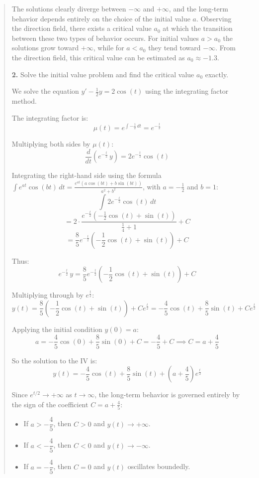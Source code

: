 \begin{quote}
\begin{respuesta}
The solutions clearly diverge between $-\infty$ and $+\infty$, and the long-term 
behavior depends entirely on the choice of the initial value $a$. Observing the 
direction field, there exists a critical value $a_0$ at which the transition between 
these two types of behavior occurs. For initial values $a > a_0$ the solutions grow 
toward $+\infty$, while for $a < a_0$ they tend toward $-\infty$. From the direction 
field, this critical value can be estimated as $a_0 \approx -1.3$.


\textbf{2. } Solve the initial value problem and find the critical value $a_0$ exactly.

We solve the equation $y' - \frac{1}{2}y = 2\cos(t)$ using the integrating factor method.

The integrating factor is:
\[
\mu(t) = e^{\int -\frac{1}{2}\,dt} = e^{-\frac{t}{2}}
\]

Multiplying both sides by $\mu(t)$:
\[
\frac{d}{dt}\left(e^{-\frac{t}{2}}\,y\right) = 2e^{-\frac{t}{2}}\cos(t)
\]

Integrating the right-hand side using the formula 
$\displaystyle\int e^{at}\cos(bt)\,dt = \frac{e^{at}(a\cos(bt)+b\sin(bt))}{a^2+b^2}$, 
with $a = -\frac{1}{2}$ and $b = 1$:
\[
\int 2e^{-\frac{t}{2}}\cos(t)\,dt 
\]
\[
= 2\cdot\frac{e^{-\frac{t}{2}}\!\left(-\frac{1}{2}\cos(t)+\sin(t)\right)}{\frac{1}{4}+1}+C
\]
\[
= \frac{8}{5}e^{-\frac{t}{2}}\!\left(-\frac{1}{2}\cos(t)+\sin(t)\right)+C
\]


Thus:
\[
e^{-\frac{t}{2}}\,y = \frac{8}{5}e^{-\frac{t}{2}}\!\left(-\frac{1}{2}\cos(t)+\sin(t)\right)+C
\]

Multiplying through by $e^{\frac{t}{2}}$:
\[
y(t) = \frac{8}{5}\left(-\frac{1}{2}\cos(t)+\sin(t)\right) + Ce^{\frac{t}{2}}
= -\frac{4}{5}\cos(t) + \frac{8}{5}\sin(t) + Ce^{\frac{t}{2}}
\]

Applying the initial condition $y(0) = a$:
\[
a = -\frac{4}{5}\cos(0) + \frac{8}{5}\sin(0) + C = -\frac{4}{5} + C
\implies C = a + \frac{4}{5}
\]

So the solution to the IV is:
\[
\boxed{y(t) = -\frac{4}{5}\cos(t) + \frac{8}{5}\sin(t) + \left(a+\frac{4}{5}\right)e^{\frac{t}{2}}}
\]

Since $e^{t/2} \to +\infty$ as $t \to \infty$, the long-term behavior is governed entirely 
by the sign of the coefficient $C = a + \frac{4}{5}$:

\begin{itemize}
    \item If $a > -\dfrac{4}{5}$, then $C > 0$ and $y(t) \to +\infty$.
    \item If $a < -\dfrac{4}{5}$, then $C < 0$ and $y(t) \to -\infty$.
    \item If $a = -\dfrac{4}{5}$, then $C = 0$ and $y(t)$ oscillates boundedly.
\end{itemize}


\end{respuesta}
\end{quote}
